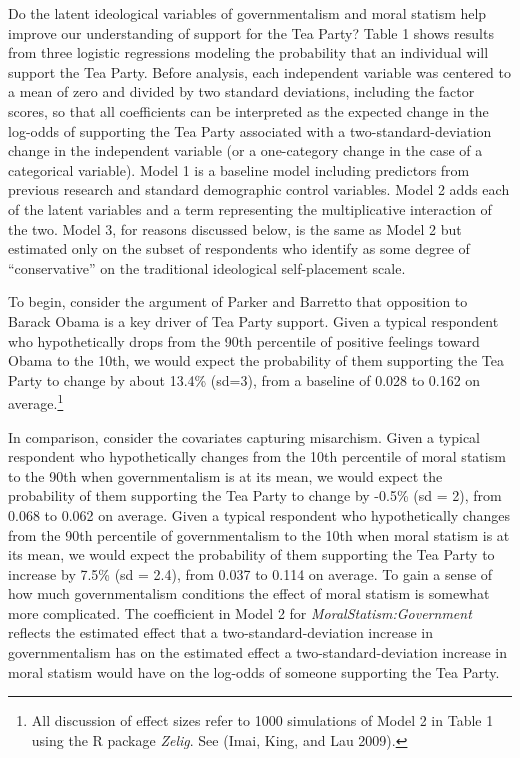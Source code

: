 \documentclass[12pt,]{article}
\let\rmarkdownfootnote\footnote%
\def\footnote{\protect\rmarkdownfootnote}
\begin{document}
Do the latent ideological variables of governmentalism and moral statism
help improve our understanding of support for the Tea Party? Table 1
shows results from three logistic regressions modeling the probability
that an individual will support the Tea Party. Before analysis, each
independent variable was centered to a mean of zero and divided by two
standard deviations, including the factor scores, so that all
coefficients can be interpreted as the expected change in the log-odds
of supporting the Tea Party associated with a two-standard-deviation
change in the independent variable (or a one-category change in the case
of a categorical variable). Model 1 is a baseline model including
predictors from previous research and standard demographic control
variables. Model 2 adds each of the latent variables and a term
representing the multiplicative interaction of the two. Model 3, for
reasons discussed below, is the same as Model 2 but estimated only on
the subset of respondents who identify as some degree of
``conservative'' on the traditional ideological self-placement scale.

To begin, consider the argument of Parker and Barretto that opposition
to Barack Obama is a key driver of Tea Party support. Given a typical
respondent who hypothetically drops from the 90th percentile of positive
feelings toward Obama to the 10th, we would expect the probability of
them supporting the Tea Party to change by about 13.4\% (sd=3), from a
baseline of 0.028 to 0.162 on average.\footnote{All discussion of effect
  sizes refer to 1000 simulations of Model 2 in Table 1 using the R
  package \emph{Zelig}. See (Imai, King, and Lau 2009).}

In comparison, consider the covariates capturing misarchism. Given a
typical respondent who hypothetically changes from the 10th percentile
of moral statism to the 90th when governmentalism is at its mean, we
would expect the probability of them supporting the Tea Party to change
by -0.5\% (sd = 2), from 0.068 to 0.062 on average. Given a typical
respondent who hypothetically changes from the 90th percentile of
governmentalism to the 10th when moral statism is at its mean, we would
expect the probability of them supporting the Tea Party to increase by
7.5\% (sd = 2.4), from 0.037 to 0.114 on average. To gain a sense of how
much governmentalism conditions the effect of moral statism is somewhat
more complicated. The coefficient in Model 2 for
\emph{MoralStatism:Government} reflects the estimated effect that a
two-standard-deviation increase in governmentalism has on the estimated
effect a two-standard-deviation increase in moral statism would have on
the log-odds of someone supporting the Tea Party.
\end{document}
